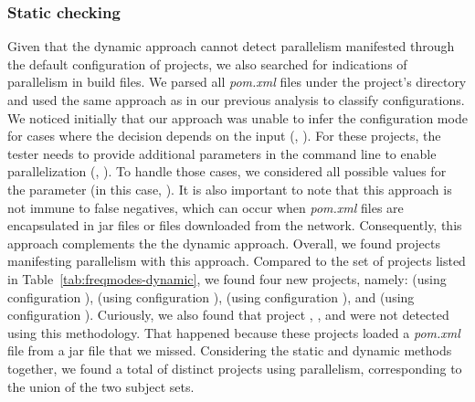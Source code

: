 \subsubsection{Static checking}
\label{sec:rqC-2}
Given that the dynamic approach cannot detect parallelism manifested
through the default
configuration of projects, we also searched for indications of parallelism in build
files.  We
parsed all \emph{pom.xml} files under the project's directory and used
the same approach as in our previous analysis to classify
configurations.  We noticed initially that our approach was unable to
infer the configuration mode for cases where the decision depends on
the input (\eg,
). For these
projects, the tester needs to provide additional parameters in the
command line to enable parallelization (\eg, ). To handle those cases, we
considered all possible values for the parameter (in this case,
).  It is also important to note that this
approach is not immune to false negatives, which can occur when
\emph{pom.xml} files are encapsulated in jar files or files downloaded from
the network.  Consequently, this approach complements the
the dynamic approach. Overall, we found \numProjectsParStatic{}
projects manifesting parallelism with this approach.
Compared to the set of projects listed in
Table~\ref{tab:freqmodes-dynamic}, we found four new projects, namely:
 (using
configuration \ParClassParMeth),  (using configuration
\ForkSeq{}),  (using configuration \ForkSeq), and
 (using configuration \ParClassParMeth).
Curiously, we also found that project , ,
and  were not detected using this methodology.
That happened because these projects loaded a \emph{pom.xml} file from
a jar file that we missed.
Considering the static and dynamic methods together, we found a total
of \numProjectsParTotal{} distinct projects using parallelism,
corresponding to the union of the two subject sets.

\vspace{1ex}
\begin{center}
\end{center}
\vspace{1ex}

